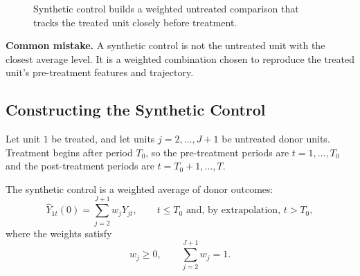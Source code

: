 \begin{figure}[h]
\centering
{}
\caption{Synthetic control builds a weighted untreated comparison that tracks the treated unit closely before treatment.}
\label{fig:sc_paths_intro}
\end{figure}

\begin{boxF}
\textbf{Common mistake.}
A synthetic control is not the untreated unit with the closest average level. It is a weighted combination chosen to reproduce the treated unit's pre-treatment features and trajectory.
\end{boxF}

\subsection{Constructing the Synthetic Control}
\hypertarget{main:sc-weights}{}
Let unit $1$ be treated, and let units $j=2,\ldots,J+1$ be untreated donor units. Treatment begins after period $T_0$, so the pre-treatment periods are $t=1,\ldots,T_0$ and the post-treatment periods are $t=T_0+1,\ldots,T$.

The synthetic control is a weighted average of donor outcomes:
\begin{equation}
\widehat{Y}_{1t}(0)
=
\sum_{j=2}^{J+1} w_j Y_{jt},
\qquad t \leq T_0 \text{ and, by extrapolation, } t > T_0,
\label{eq:sc_synth_outcome}
\end{equation}
where the weights satisfy
\begin{equation}
w_j \geq 0, \qquad \sum_{j=2}^{J+1} w_j = 1.
\label{eq:sc_weight_restrictions}
\end{equation}

